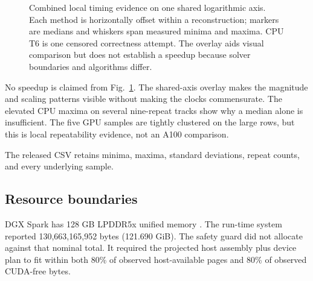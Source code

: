 \documentclass[10pt,journal]{IEEEtran}
\newcommand{\sgshpr}{sGS-HPR}
\begin{document}
\begin{figure}[!t]
\caption{Combined local timing evidence on one shared logarithmic axis. Each
method is horizontally offset within a reconstruction; markers are medians and
whiskers span measured minima and maxima. CPU T6 is one censored correctness
attempt. The overlay aids visual comparison but does not establish a speedup
because solver boundaries and algorithms differ.}
\label{fig:timings}
\end{figure}

No speedup is claimed from Fig.~\ref{fig:timings}. The shared-axis overlay makes
the magnitude and scaling patterns visible without making the clocks
commensurate. The elevated CPU maxima on several nine-repeat tracks show why a
median alone is insufficient. The five GPU samples are tightly clustered on
the large rows, but this is local repeatability evidence, not an A100
comparison.

The released CSV retains minima, maxima, standard deviations, repeat counts,
and every underlying sample.

\subsection{Resource boundaries}

DGX Spark has 128 GB LPDDR5x unified memory \cite{dgxspark}. The run-time
system reported 130,663,165,952 bytes (121.690 GiB). The safety guard did not
allocate against that nominal total. It required the projected host
assembly plus device plan to fit within both 80\% of observed host-available
pages and 80\% of observed CUDA-free bytes.
\end{document}
